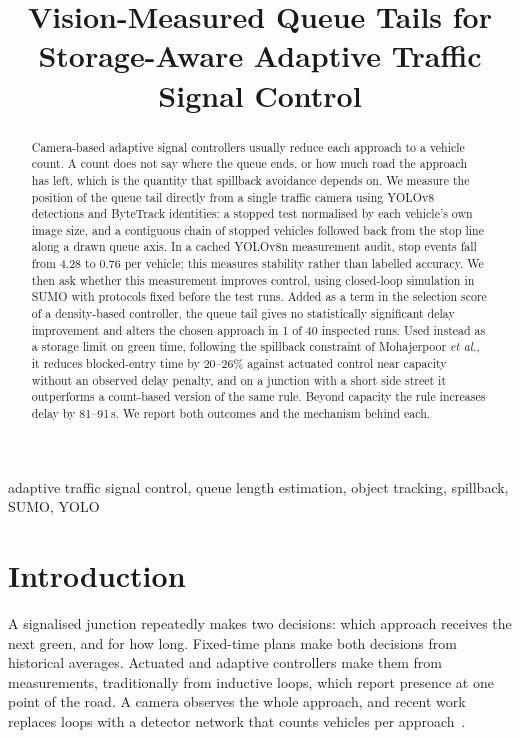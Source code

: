 \documentclass[conference]{IEEEtran}
\begin{document}
\title{Vision-Measured Queue Tails for Storage-Aware Adaptive Traffic Signal Control}

\author{
}

\maketitle

\begin{abstract}
Camera-based adaptive signal controllers usually reduce each approach to a vehicle
count. A count does not say where the queue ends, or how much road the approach has
left, which is the quantity that spillback avoidance depends on. We measure the
position of the queue tail directly from a single traffic camera using YOLOv8
detections and ByteTrack identities: a stopped test normalised by each vehicle's own
image size, and a contiguous chain of stopped vehicles followed back from the stop
line along a drawn queue axis. In a cached YOLOv8n measurement audit, stop events fall from 4.28 to 0.76 per vehicle; this measures stability rather than labelled accuracy. We then ask whether this measurement improves control,
using closed-loop simulation in SUMO with protocols fixed before the test runs. Added
as a term in the selection score of a density-based controller, the queue tail gives no statistically significant delay improvement and alters the chosen approach in 1 of 40 inspected runs. Used instead as a storage limit on green time, following the spillback constraint
of Mohajerpoor \emph{et al.}, it reduces blocked-entry time by 20--26\% against actuated
control near capacity without an observed delay penalty, and on a junction with a
short side street it outperforms a count-based version of the same rule. Beyond
capacity the rule increases delay by 81--91\,s. We report both outcomes and the
mechanism behind each.
\end{abstract}

\begin{IEEEkeywords}
adaptive traffic signal control, queue length estimation, object tracking, spillback,
SUMO, YOLO
\end{IEEEkeywords}

\section{Introduction}
A signalised junction repeatedly makes two decisions: which approach receives the next
green, and for how long. Fixed-time plans make both decisions from historical averages.
Actuated and adaptive controllers make them from measurements, traditionally from
inductive loops, which report presence at one point of the road. A camera observes the
whole approach, and recent work replaces loops with a detector network that counts
vehicles per approach~\cite{raza2025}.
\end{document}
